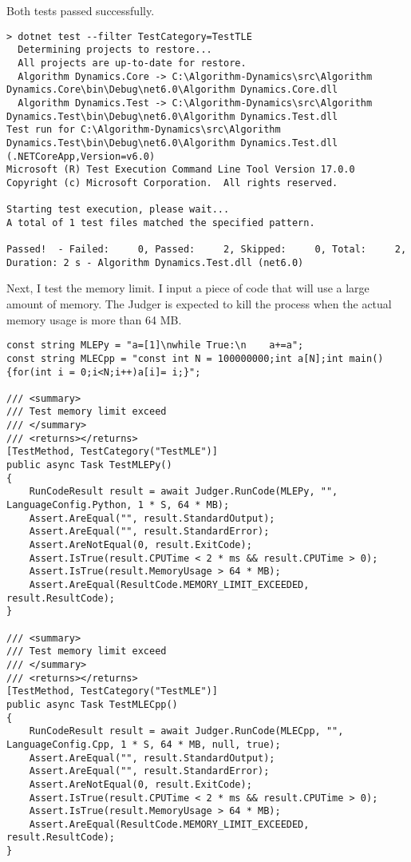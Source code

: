 \documentclass[report.tex]{subfiles}
\begin{document}
Both tests passed successfully.

\begin{verbatim}
> dotnet test --filter TestCategory=TestTLE
  Determining projects to restore...
  All projects are up-to-date for restore.
  Algorithm Dynamics.Core -> C:\Algorithm-Dynamics\src\Algorithm Dynamics.Core\bin\Debug\net6.0\Algorithm Dynamics.Core.dll
  Algorithm Dynamics.Test -> C:\Algorithm-Dynamics\src\Algorithm Dynamics.Test\bin\Debug\net6.0\Algorithm Dynamics.Test.dll
Test run for C:\Algorithm-Dynamics\src\Algorithm Dynamics.Test\bin\Debug\net6.0\Algorithm Dynamics.Test.dll (.NETCoreApp,Version=v6.0)
Microsoft (R) Test Execution Command Line Tool Version 17.0.0
Copyright (c) Microsoft Corporation.  All rights reserved.

Starting test execution, please wait...
A total of 1 test files matched the specified pattern.

Passed!  - Failed:     0, Passed:     2, Skipped:     0, Total:     2, Duration: 2 s - Algorithm Dynamics.Test.dll (net6.0)
\end{verbatim}

Next, I test the memory limit. I input a piece of code that will use a large amount of memory. The Judger is expected to kill the process when the actual memory usage is more than 64 MB.

\begin{verbatim}
const string MLEPy = "a=[1]\nwhile True:\n    a+=a";
const string MLECpp = "const int N = 100000000;int a[N];int main(){for(int i = 0;i<N;i++)a[i]= i;}";

/// <summary>
/// Test memory limit exceed
/// </summary>
/// <returns></returns>
[TestMethod, TestCategory("TestMLE")]
public async Task TestMLEPy()
{
    RunCodeResult result = await Judger.RunCode(MLEPy, "", LanguageConfig.Python, 1 * S, 64 * MB);
    Assert.AreEqual("", result.StandardOutput);
    Assert.AreEqual("", result.StandardError);
    Assert.AreNotEqual(0, result.ExitCode);
    Assert.IsTrue(result.CPUTime < 2 * ms && result.CPUTime > 0);
    Assert.IsTrue(result.MemoryUsage > 64 * MB);
    Assert.AreEqual(ResultCode.MEMORY_LIMIT_EXCEEDED, result.ResultCode);
}

/// <summary>
/// Test memory limit exceed
/// </summary>
/// <returns></returns>
[TestMethod, TestCategory("TestMLE")]
public async Task TestMLECpp()
{
    RunCodeResult result = await Judger.RunCode(MLECpp, "", LanguageConfig.Cpp, 1 * S, 64 * MB, null, true);
    Assert.AreEqual("", result.StandardOutput);
    Assert.AreEqual("", result.StandardError);
    Assert.AreNotEqual(0, result.ExitCode);
    Assert.IsTrue(result.CPUTime < 2 * ms && result.CPUTime > 0);
    Assert.IsTrue(result.MemoryUsage > 64 * MB);
    Assert.AreEqual(ResultCode.MEMORY_LIMIT_EXCEEDED, result.ResultCode);
}
\end{verbatim}
\end{document}
